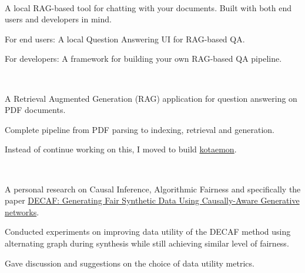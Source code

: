 \\
\begin{zitemize}
    \item A local RAG-based tool for chatting with your documents. Built with both end users and developers in mind.
    \item For end users: A local Question Answering UI for RAG-based QA.
    \item For developers: A framework for building your own RAG-based QA pipeline.
\end{zitemize}

\\
\begin{zitemize}
    \item A Retrieval Augmented Generation (RAG) application for question answering on PDF
    documents.
    \item Complete pipeline from PDF parsing to indexing, retrieval and generation.
    \item Instead of continue working on this, I moved to build \href{https://github.com/Cinnamon/kotaemon}{kotaemon}.
\end{zitemize}


\\
\begin{zitemize}
    \item A personal research on Causal Inference, Algorithmic Fairness and specifically the paper \href{https://arxiv.org/abs/2110.12884}{DECAF: Generating Fair Synthetic Data Using Causally-Aware Generative networks}.
    \item Conducted experiments on improving data utility of the DECAF method using alternating graph during synthesis while still achieving similar level of  fairness.
    \item Gave discussion and suggestions on the choice of data utility metrics.
\end{zitemize}

